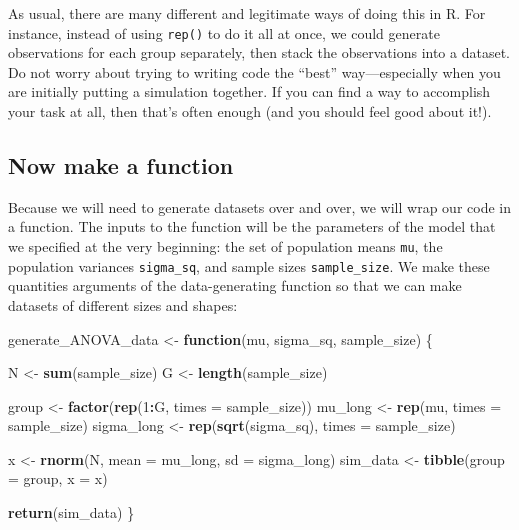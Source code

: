 \documentclass[
]{book}
\newenvironment{Shaded}{\begin{snugshade}}{\end{snugshade}}
\newcommand{\AttributeTok}[1]{\textcolor[rgb]{0.13,0.29,0.53}{#1}}
\newcommand{\ControlFlowTok}[1]{\textcolor[rgb]{0.13,0.29,0.53}{\textbf{#1}}}
\newcommand{\DecValTok}[1]{\textcolor[rgb]{0.00,0.00,0.81}{#1}}
\newcommand{\FunctionTok}[1]{\textcolor[rgb]{0.13,0.29,0.53}{\textbf{#1}}}
\newcommand{\NormalTok}[1]{#1}
\newcommand{\OtherTok}[1]{\textcolor[rgb]{0.56,0.35,0.01}{#1}}
\newcommand{\SpecialCharTok}[1]{\textcolor[rgb]{0.81,0.36,0.00}{\textbf{#1}}}
\begin{document}
As usual, there are many different and legitimate ways of doing this in R.
For instance, instead of using \texttt{rep()} to do it all at once, we could generate observations for each group separately, then stack the observations into a dataset.
Do not worry about trying to writing code the ``best'' way---especially when you are initially putting a simulation together.
If you can find a way to accomplish your task at all, then that's often enough (and you should feel good about it!).

\subsection{Now make a function}\label{now-make-a-function}

Because we will need to generate datasets over and over, we will wrap our code in a function.
The inputs to the function will be the parameters of the model that we specified at the very beginning: the set of population means \texttt{mu}, the population variances \texttt{sigma\_sq}, and sample sizes \texttt{sample\_size}. We make these quantities arguments of the data-generating function so that we can make datasets of different sizes and shapes:

\begin{Shaded}
\begin{Highlighting}[]
\NormalTok{generate\_ANOVA\_data }\OtherTok{\textless{}{-}} \ControlFlowTok{function}\NormalTok{(mu, sigma\_sq, sample\_size) \{}
  
\NormalTok{  N }\OtherTok{\textless{}{-}} \FunctionTok{sum}\NormalTok{(sample\_size)}
\NormalTok{  G }\OtherTok{\textless{}{-}} \FunctionTok{length}\NormalTok{(sample\_size)}
  
\NormalTok{  group }\OtherTok{\textless{}{-}} \FunctionTok{factor}\NormalTok{(}\FunctionTok{rep}\NormalTok{(}\DecValTok{1}\SpecialCharTok{:}\NormalTok{G, }\AttributeTok{times =}\NormalTok{ sample\_size))}
\NormalTok{  mu\_long }\OtherTok{\textless{}{-}} \FunctionTok{rep}\NormalTok{(mu, }\AttributeTok{times =}\NormalTok{ sample\_size)}
\NormalTok{  sigma\_long }\OtherTok{\textless{}{-}} \FunctionTok{rep}\NormalTok{(}\FunctionTok{sqrt}\NormalTok{(sigma\_sq), }\AttributeTok{times =}\NormalTok{ sample\_size)}
  
\NormalTok{  x }\OtherTok{\textless{}{-}} \FunctionTok{rnorm}\NormalTok{(N, }\AttributeTok{mean =}\NormalTok{ mu\_long, }\AttributeTok{sd =}\NormalTok{ sigma\_long)}
\NormalTok{  sim\_data }\OtherTok{\textless{}{-}} \FunctionTok{tibble}\NormalTok{(}\AttributeTok{group =}\NormalTok{ group, }\AttributeTok{x =}\NormalTok{ x)}
  
  \FunctionTok{return}\NormalTok{(sim\_data)}
\NormalTok{\}}
\end{Highlighting}
\end{Shaded}
\end{document}
